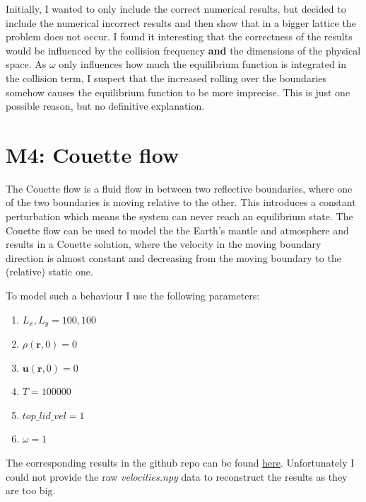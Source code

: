 Initially, I wanted to only include the correct numerical results, but decided to include the numerical incorrect results and then show that in a bigger lattice the problem does not occur.
I found it interesting that the correctness of the results would be influenced by the collision frequency \textbf{and} the dimensions of the physical space. 
As $\omega$ only influences how much the equilibrium function is integrated in the collision term, I suspect that the increased rolling over the boundaries somehow causes the equilibrium function to be more imprecise. 
This is just one possible reason, but no definitive explanation.

\section{M4: Couette flow}
The Couette flow is a fluid flow in between two reflective boundaries, where one of the two boundaries is moving relative to the other. 
This introduces a constant perturbation which means the system can never reach an equilibrium state.
The Couette flow can be used to model the the Earth's mantle and atmosphere and results in a Couette solution, where the velocity in the moving boundary direction is almost constant and decreasing from the moving boundary to the (relative) static one.

To model such a behaviour I use the following parameters:
\begin{enumerate}
    \item $L_{x}, L_{y} = 100, 100$
    \item $\rho(\textbf{r}, 0) = 0$
    \item $\textbf{u}(\textbf{r}, 0) = 0$
    \item $T = 100000$
    \item $top\_lid\_vel = 1$
    \item $\omega = 1$
\end{enumerate}
The corresponding results in the github repo can be found  \href{https://github.com/jonas27/pylbm/blob/master/milestones/m4/m4.ipynb}{here}. Unfortunately I could not provide the raw \textit{velocities.npy} data to reconstruct the results as they are too big. 

